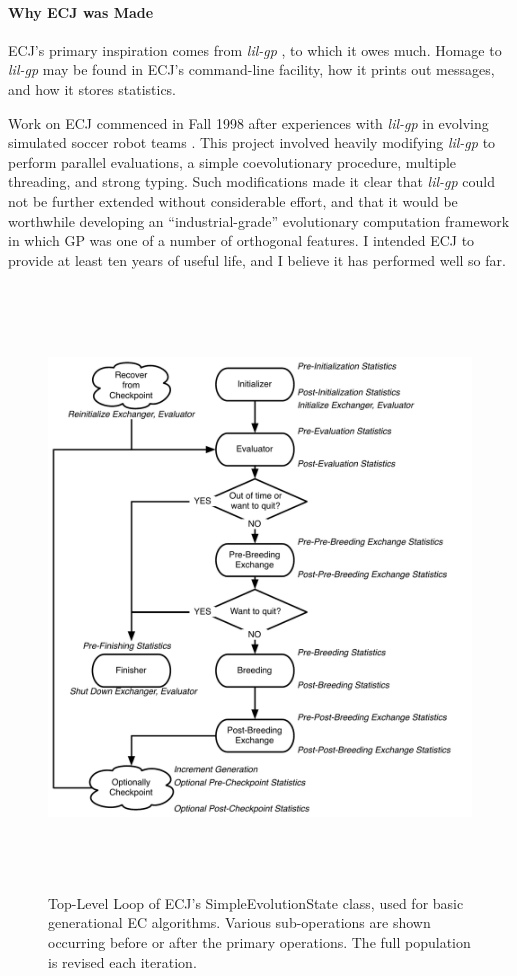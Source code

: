 \documentclass[twoside,10pt]{book}
\newcommand\class[1]{\index{#1}\textsf{#1}}
\begin{document}
\paragraph{Why ECJ was Made}

ECJ's primary inspiration comes from {\it lil-gp} \cite{lilgp}, to which it owes much.  Homage to {\it lil-gp} may be found in ECJ's command-line facility, how it prints out messages, and how it stores statistics.

Work on ECJ commenced in Fall 1998 after experiences with {\it lil-gp} in evolving simulated soccer robot teams \cite{luke:genetic1998}.  This project involved heavily modifying {\it lil-gp} to perform parallel evaluations, a simple coevolutionary procedure, multiple threading, and strong typing.  Such modifications made it clear that {\it lil-gp} could not be further extended without considerable effort, and that it would be worthwhile developing an ``industrial-grade'' evolutionary computation framework in which GP was one of a number of orthogonal features.  I intended ECJ to provide at least ten years of useful life, and I believe it has performed well so far.

\begin{figure}[t]
\begin{center}
\includegraphics[height=6.3in]{EvolutionState.pdf}
\end{center}
\caption{Top-Level Loop of ECJ's \class{SimpleEvolutionState} class, used for basic generational EC algorithms.  Various sub-operations are shown occurring before or after the primary operations.  The full population is revised each iteration. }
\label{EvolutionState}
\end{figure}
\afterpage{\clearpage}
\end{document}
